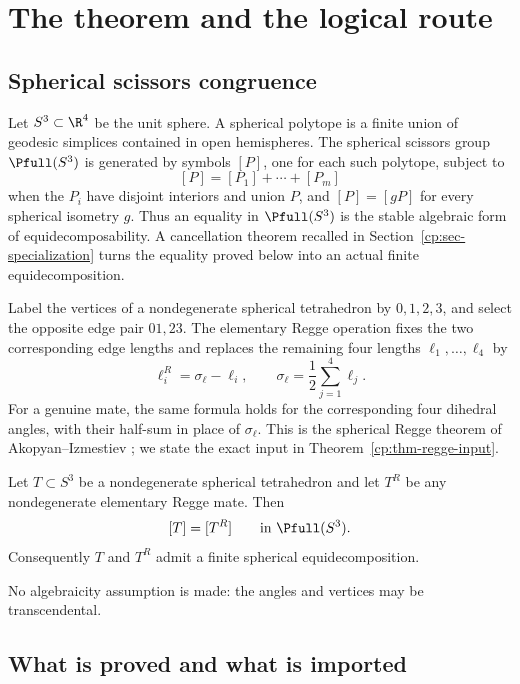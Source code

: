 \section{The theorem and the logical route}
\label{cp:sec-statement}

\subsection{Spherical scissors congruence}

Let \(S^3\subset\R^4\) be the unit sphere.  A spherical polytope is a
finite union of geodesic simplices contained in open hemispheres.  The
spherical scissors group \(\Pfull(S^3)\) is generated by symbols \([P]\),
one for each such polytope, subject to
\[
 [P]=[P_1]+\cdots+[P_m]
\]
when the \(P_i\) have disjoint interiors and union \(P\), and
\([P]=[gP]\) for every spherical isometry \(g\).  Thus an equality in
\(\Pfull(S^3)\) is the stable algebraic form of equidecomposability.  A
cancellation theorem recalled in Section~\ref{cp:sec-specialization} turns
the equality proved below into an actual finite equidecomposition.

Label the vertices of a nondegenerate spherical tetrahedron by
\(0,1,2,3\), and select the opposite edge pair \(01,23\).  The elementary
Regge operation fixes the two corresponding edge lengths and replaces the
remaining four lengths
\(\ell_1,\ldots,\ell_4\) by
\begin{equation}
 \ell_i^R=\sigma_\ell-\ell_i,
 \qquad
 \sigma_\ell=\frac12\sum_{j=1}^4\ell_j.
 \label{cp:eq-regge-lengths}
\end{equation}
For a genuine mate, the same formula holds for the corresponding four
dihedral angles, with their half-sum in place of \(\sigma_\ell\).  This is
the spherical Regge theorem of Akopyan--Izmestiev
\cite{AkopyanIzmestiev2019}; we state the exact input in
Theorem~\ref{cp:thm-regge-input}.

\begin{theorem}
\label{cp:thm-main}
Let \(T\subset S^3\) be a nondegenerate spherical tetrahedron and let
\(T^R\) be any nondegenerate elementary Regge mate.  Then
\[
 [T]=[T^R]\qquad\text{in }\Pfull(S^3).
\]
Consequently \(T\) and \(T^R\) admit a finite spherical
equidecomposition.
\end{theorem}

No algebraicity assumption is made: the angles and vertices may be
transcendental.

\subsection{What is proved and what is imported}


